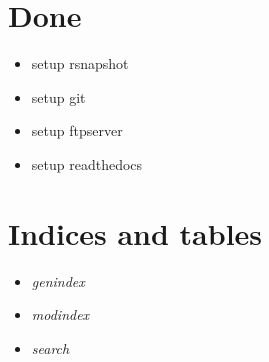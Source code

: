\documentclass[letterpaper,10pt,english]{sphinxmanual}
\begin{document}
\chapter{Done}
\label{index:done}\begin{itemize}
\item {} 
setup rsnapshot

\item {} 
setup git

\item {} 
setup ftpserver

\item {} 
setup readthedocs

\end{itemize}


\chapter{Indices and tables}
\label{index:indices-and-tables}\begin{itemize}
\item {} 
\emph{genindex}

\item {} 
\emph{modindex}

\item {} 
\emph{search}

\end{itemize}



\renewcommand{\indexname}{Index}
\printindex
\end{document}
